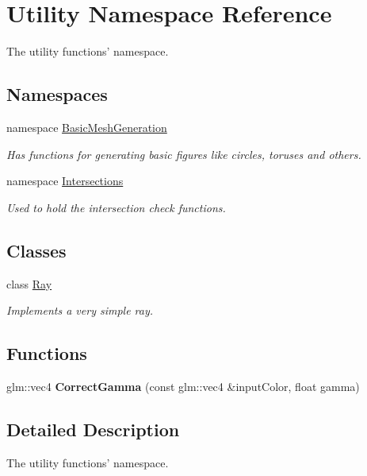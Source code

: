 \hypertarget{namespace_utility}{\section{Utility Namespace Reference}
\label{namespace_utility}
}


The utility functions' namespace.  


\subsection*{Namespaces}
\begin{DoxyCompactItemize}
\item 
namespace \hyperlink{namespace_utility_1_1_basic_mesh_generation}{Basic\-Mesh\-Generation}
\begin{DoxyCompactList}\small\item\em Has functions for generating basic figures like circles, toruses and others. \end{DoxyCompactList}\item 
namespace \hyperlink{namespace_utility_1_1_intersections}{Intersections}
\begin{DoxyCompactList}\small\item\em Used to hold the intersection check functions. \end{DoxyCompactList}\end{DoxyCompactItemize}
\subsection*{Classes}
\begin{DoxyCompactItemize}
\item 
class \hyperlink{class_utility_1_1_ray}{Ray}
\begin{DoxyCompactList}\small\item\em Implements a very simple ray. \end{DoxyCompactList}\end{DoxyCompactItemize}
\subsection*{Functions}
\begin{DoxyCompactItemize}
\item 
\hypertarget{namespace_utility_a3d50a44d144c24db38409f79c8b1b740}{glm\-::vec4 {\bfseries Correct\-Gamma} (const glm\-::vec4 \&input\-Color, float gamma)}\label{namespace_utility_a3d50a44d144c24db38409f79c8b1b740}

\end{DoxyCompactItemize}


\subsection{Detailed Description}
The utility functions' namespace. 